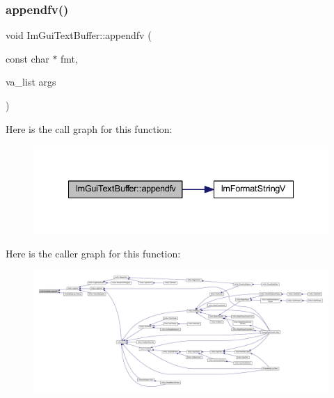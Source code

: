 \mbox{\label{struct_im_gui_text_buffer_ac8a6b11834c4cee8113bf6950e66112e}} 
\subsubsection{\texorpdfstring{appendfv()}{appendfv()}}
{\footnotesize\ttfamily void Im\+Gui\+Text\+Buffer\+::appendfv (\begin{DoxyParamCaption}\item[{const char $\ast$}]{fmt,  }\item[{va\+\_\+list}]{args }\end{DoxyParamCaption})}

Here is the call graph for this function\+:
\nopagebreak
\begin{figure}[H]
\begin{center}
\leavevmode
\includegraphics[width=335pt]{struct_im_gui_text_buffer_ac8a6b11834c4cee8113bf6950e66112e_cgraph}
\end{center}
\end{figure}
Here is the caller graph for this function\+:
\nopagebreak
\begin{figure}[H]
\begin{center}
\leavevmode
\includegraphics[width=350pt]{struct_im_gui_text_buffer_ac8a6b11834c4cee8113bf6950e66112e_icgraph}
\end{center}
\end{figure}
\mbox{\label{struct_im_gui_text_buffer_aab6d83c6b9a8061287a4cb6135c1cab4}} 
